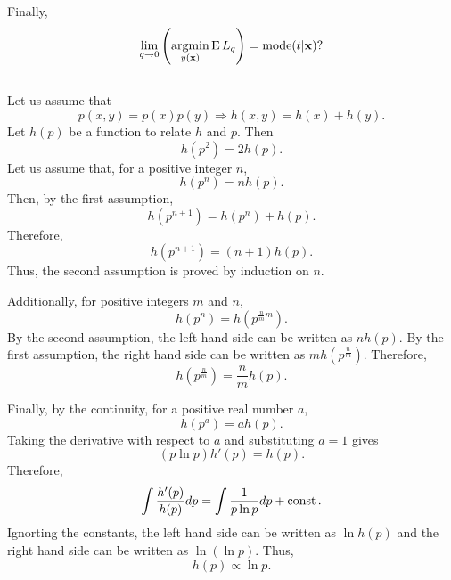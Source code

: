 Finally, 
%
\begin{equation}
\lim_{q \to 0}
\left(
	\operatorname*{arg min}_{y(\mathbf{x})}
	\operatorname{E} L_q
\right)
=
\operatorname{mode} (t | \mathbf{x}) ?
\end{equation}
%


\subsection{}
\label{1.28}
Let us assume that
%
\begin{equation}
p(x, y) 
= 
p(x) 
p(y) 
\Rightarrow 
h(x, y) 
= 
h(x) 
+ 
h(y).
\end{equation}
%
Let $h(p)$ be a function to relate $h$ and $p$.
Then
%
\begin{equation}
h 
\left( 
	p ^ 2 
\right)
= 
2
h(p).
\end{equation}
%
Let us assume that, for a positive integer $n$,
%
\begin{equation}
h 
\left( 
	p ^ n 
\right) 
= 
n 
h(p).
\end{equation}
%
Then, by the first assumption,
%
\begin{equation}
h 
\left( 
	p ^ {n + 1} 
\right) 
= 
h 
\left( 
	p ^ n 
\right) 
+ 
h(p).
\end{equation}
%
Therefore,
%
\begin{equation}
h 
\left( 
	p ^ {n + 1} 
\right) 
= 
(n + 1) 
h(p).
\end{equation}
%
Thus, the second assumption is proved by induction on $n$.

Additionally, for positive integers $m$ and $n$, 
%
\begin{equation}
h 
\left( 
	p ^ n 
\right) 
= 
h 
\left(
	 p ^ {\frac{n}{m} m} 
\right).
\end{equation}
%
By the second assumption, the left hand side can be written as $n h(p)$.
By the first assumption, the right hand side can be written as $m h \left( p ^ \frac{n}{m} \right)$.
Therefore,
%
\begin{equation}
h 
\left(
	p ^ \frac{n}{m} 
\right) 
= 
\frac{n}{m} 
h(p).
\end{equation}
%

Finally, by the continuity, for a positive real number $a$,
%
\begin{equation}
h 
\left( 
	p ^a 
\right) 
= 
a 
h(p).
\end{equation}
%
Taking the derivative with respect to $a$ and substituting $a = 1$ gives
%
\begin{equation}
(p \ln p) 
h' (p) 
= 
h(p).
\end{equation}
%
Therefore,
%
\begin{equation}
\int 
\frac{h'(p)}{h(p)} 
dp 
= 
\int 
\frac{1}{p \ln p} 
dp 
+ 
\operatorname{const}.
\end{equation}
%
Ignorting the constants, the left hand side can be written as $\ln h(p)$ and the right hand side can be written as $\ln (\ln p)$.
Thus,
%
\begin{equation}
h(p) 
\propto 
\ln p.
\end{equation}
%


